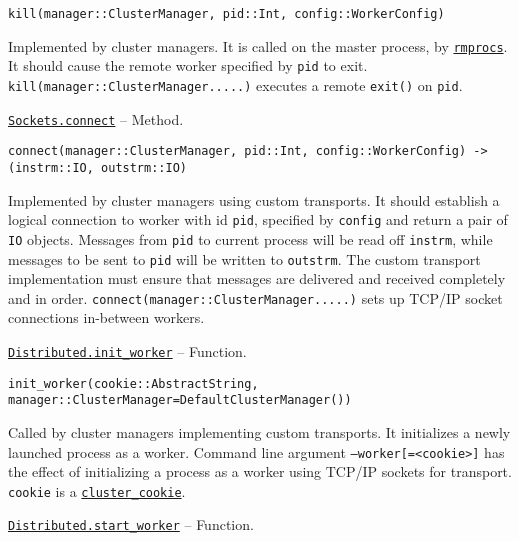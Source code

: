 \begin{adjustwidth}{2em}{0pt}


\begin{verbatim}
kill(manager::ClusterManager, pid::Int, config::WorkerConfig)
\end{verbatim}

Implemented by cluster managers. It is called on the master process, by \hyperlink{16165500032398890398}{\texttt{rmprocs}}. It should cause the remote worker specified by \texttt{pid} to exit. \texttt{kill(manager::ClusterManager.....)} executes a remote \texttt{exit()} on \texttt{pid}.



\end{adjustwidth}
\hypertarget{5152827542417649360}{}
\hyperlink{5152827542417649360}{\texttt{Sockets.connect}}  -- {Method.}

\begin{adjustwidth}{2em}{0pt}


\begin{verbatim}
connect(manager::ClusterManager, pid::Int, config::WorkerConfig) -> (instrm::IO, outstrm::IO)
\end{verbatim}

Implemented by cluster managers using custom transports. It should establish a logical connection to worker with id \texttt{pid}, specified by \texttt{config} and return a pair of \texttt{IO} objects. Messages from \texttt{pid} to current process will be read off \texttt{instrm}, while messages to be sent to \texttt{pid} will be written to \texttt{outstrm}. The custom transport implementation must ensure that messages are delivered and received completely and in order. \texttt{connect(manager::ClusterManager.....)} sets up TCP/IP socket connections in-between workers.



\end{adjustwidth}
\hypertarget{12889811459778306363}{}
\hyperlink{12889811459778306363}{\texttt{Distributed.init\_worker}}  -- {Function.}

\begin{adjustwidth}{2em}{0pt}


\begin{verbatim}
init_worker(cookie::AbstractString, manager::ClusterManager=DefaultClusterManager())
\end{verbatim}

Called by cluster managers implementing custom transports. It initializes a newly launched process as a worker. Command line argument \texttt{--worker[=<cookie>]} has the effect of initializing a process as a worker using TCP/IP sockets for transport. \texttt{cookie} is a \hyperlink{914110747490695974}{\texttt{cluster\_cookie}}.



\end{adjustwidth}
\hypertarget{3765538736204641537}{}
\hyperlink{3765538736204641537}{\texttt{Distributed.start\_worker}}  -- {Function.}

